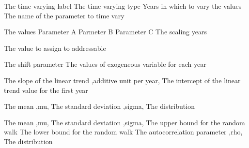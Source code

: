  {The time-varying label}
 {The time-varying type}
 {Years in which to vary the values}
 {The name of the parameter to time vary}
\par\textbf{}\par
{} {The values}
 {Parameter A}
 {Parmeter B}
 {Parameter C}
 {The scaling years}
\par\textbf{}\par
{} {The value to assign to addressable}
\par\textbf{}\par
{} {The shift parameter}
 {The values of exogeneous variable for each year}
\par\textbf{}\par
{} {The slope of the linear trend ,additive unit per year,}
 {The intercept of the linear trend value for the first year}
\par\textbf{}\par
{} {The mean ,mu,}
 {The standard deviation ,sigma,}
 {The distribution}
\par\textbf{}\par
{} {The mean ,mu,}
 {The standard deviation ,sigma,}
 {The upper bound for the random walk}
 {The lower bound for the random walk}
 {The autocorrelation parameter ,rho,}
 {The distribution}
